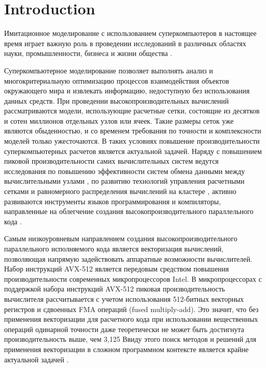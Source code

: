 \documentclass[
11pt,%
tightenlines,%
twoside,%
onecolumn,%
nofloats,%
nobibnotes,%
nofootinbib,%
superscriptaddress,%
noshowpacs,%
centertags]%
{revtex4}
\begin{document}


\maketitle

\section{Introduction}

Имитационное моделирование с использованием суперкомпьютеров в настоящее время играет важную роль в проведении исследований в различных областях науки, промышленности, бизнеса и жизни общества \cite{FadeevWheather, HuSeismic, JonesFluid}.

Суперкомпьютерное моделирование позволяет выполнять анализ и многокритериальную оптимизацию процессов взаимодействия объектов окружающего мира и извлекать информацию, недоступную без использования данных средств.
При проведении высокопроизводительных вычислений рассматриваются модели, использующие расчетные сетки, состоящие из десятков и сотен миллионов отдельных узлов или ячеек.
Такие размеры сеток уже являются обыденностью, и со временем требования по точности и комплексности моделей только ужесточаются.
В таких условиях повышение производительности суперкомпьютерных расчетов является актуальной задачей.
Наряду с повышением пиковой производительности самих вычислительных систем ведутся исследования по повышению эффективности систем обмена данными между вычислительными узлами \cite{KalantzisMPI}, по развитию технологий управления расчетными сетками \cite{Rybakov} и равномерного распределения вычислений на кластере \cite{BaranovWorkload}, активно развиваются инструменты языков программирования и компиляторы, направленные на облегчение создания высокопроизводительного параллельного кода \cite{DoerfertPar}.

Самым низкоуровневым направлением создания высокопроизводительного параллельного исполняемого кода является векторизация вычислений, позволяющая напрямую задействовать аппаратные возможности вычислителей.
Набор инструкций AVX-512 является передовым средством повышения производительности современных микропроцессоров Intel.
В микропроцессорах с поддержкой набора инструкций AVX-512 пиковая производительность вычислителя рассчитывается с учетом использования 512-битных векторных регистров и сдвоенных FMA операций (fused multiply-add).
Это значит, что без применения векторизации для расчетного кода при использовании вещественных операций одинарной точности даже теоретически не может быть достигнута производительность выше, чем 3,125%
Ввиду этого поиск методов и решений для применения векторизации в сложном программном контексте является крайне актуальной задачей \cite{ShabanovVec}.
\end{document}
